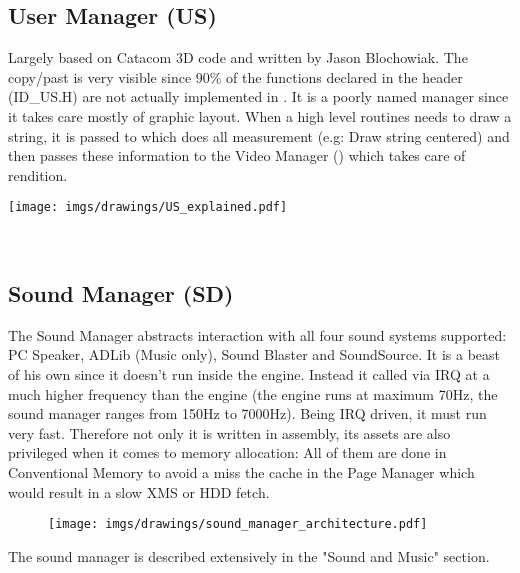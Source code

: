 \documentclass[book.tex]{subfiles}
\begin{document}
\subsection{User Manager (US)}
\begin{minipage}{0.7\textwidth}
Largely based on Catacom 3D code and written by Jason Blochowiak. The copy/past is very visible since 90\% of the functions declared in the header (ID\_US.H) are not actually implemented in . 
It is a poorly named manager since it takes care mostly of graphic layout. When a  high level routines needs to draw a string, it is passed to  which does all measurement (e.g: Draw string centered)
and then passes these information to the Video Manager () which takes care of rendition.
\end{minipage}
\begin{minipage}{0.3\textwidth}
\begin{flushright}
\texttt{[image: imgs/drawings/US\_explained.pdf]}
\end{flushright}
\end{minipage}
\noindent
\\












\subsection{Sound Manager (SD)}
The Sound Manager abstracts interaction with all four sound systems supported: PC Speaker, ADLib (Music only), Sound Blaster and SoundSource. It is a beast of his own since it doesn't run inside the engine. Instead it called via IRQ at a much higher frequency than the engine (the engine runs at maximum 70Hz, the sound manager ranges from 150Hz to 7000Hz). Being IRQ driven, it must run very fast. Therefore not only it is written in assembly, its assets are also privileged when it comes to memory allocation: All of them are done in Conventional Memory to avoid a miss the cache in the Page Manager which would result in a slow XMS or HDD fetch.\\
 \par
\begin{figure}[H]
\centering
 \texttt{[image: imgs/drawings/sound\_manager\_architecture.pdf]}
 \end{figure}
 \par
The sound manager is described extensively in the "Sound and Music" section.
\end{document}
